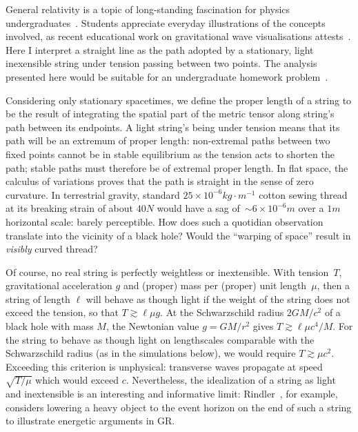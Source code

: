 \documentclass{ws-tpe}
\begin{document}
General relativity is a topic of long-standing fascination for physics
undergraduates~\cite{christensen2012,taylor2000}.  Students appreciate
everyday illustrations of the concepts involved, as recent educational
work on gravitational wave visualisations attests~\cite{overduin2018}.
Here I interpret a straight line as the path adopted by a stationary,
light inexensible string under tension passing between two points.
The analysis presented here would be suitable for an undergraduate
homework problem~\cite{romano2019}.

Considering only stationary spacetimes, we define the proper length of
a string to be the result of integrating the spatial part of the
metric tensor along string's path between its endpoints.  A light
string's being under tension means that its path will be an extremum
of proper length: non-extremal paths between two fixed points cannot
be in stable equilibrium as the tension acts to shorten the path;
stable paths must therefore be of extremal proper length.  In flat
space, the calculus of variations proves that the path is straight in
the sense of zero curvature.  In terrestrial gravity, standard
$25\times 10^{-6}\unit{kg}\cdot\unit{m}^{-1}$ cotton sewing thread at
its breaking strain of about $40\unit{N}$ would have a sag of~${\sim}
6\times 10^{-6}\unit{m}$ over a $1\unit{m}$ horizontal scale: barely
perceptible.  How does such a quotidian observation translate into the
vicinity of a black hole?  Would the ``warping of space'' result in
{\em visibly} curved thread?

Of course, no real string is perfectly weightless or inextensible.
With tension~$T$, gravitational acceleration $g$ and (proper) mass per
(proper) unit length~$\mu$, then a string of length $\ell$ will behave
as though light if the weight of the string does not exceed the
tension, so that $T\gtrsim\ell\mu g$.  At the Schwarzschild radius
$2GM/c^2$ of a black hole with mass $M$, the Newtonian value
$g=GM/r^2$ gives $T\gtrsim\ell\mu c^4/M$.  For the string to behave as
though light on lengthscales comparable with the Schwarzschild radius
(as in the simulations below), we would require $T\gtrsim\mu c^2$.
Exceeding this criterion is unphysical:
transverse waves propagate at
speed~$\sqrt{T/\mu}$ which would exceed $c$.  Nevertheless, the idealization of a
string as light and inextensible is an interesting and informative
limit: Rindler~\cite{rindler}, for example, considers lowering a heavy
object to the event horizon on the end of such a string to illustrate
energetic arguments in GR.
\end{document}
